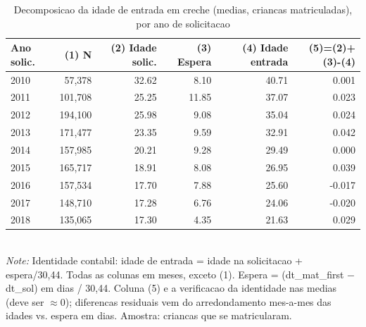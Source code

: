 \begin{table}[htbp]\centering
\caption{Decomposicao da idade de entrada em creche (medias, criancas matriculadas), por ano de solicitacao}
\label{tab:T3_decomp}
\small
\setlength{\tabcolsep}{4pt}
\begin{tabular}{lrrrrr}
\toprule
Ano solic. & (1) N & (2) Idade solic. & (3) Espera & (4) Idade entrada & (5)=(2)+(3)-(4) \\
\midrule
2010 & 57,378 & 32.62 & 8.10 & 40.71 & 0.001 \\
2011 & 101,708 & 25.25 & 11.85 & 37.07 & 0.023 \\
2012 & 194,100 & 25.98 & 9.08 & 35.04 & 0.024 \\
2013 & 171,477 & 23.35 & 9.59 & 32.91 & 0.042 \\
2014 & 157,985 & 20.21 & 9.28 & 29.49 & 0.000 \\
2015 & 165,717 & 18.91 & 8.08 & 26.95 & 0.039 \\
2016 & 157,534 & 17.70 & 7.88 & 25.60 & -0.017 \\
2017 & 148,710 & 17.28 & 6.76 & 24.06 & -0.020 \\
2018 & 135,065 & 17.30 & 4.35 & 21.63 & 0.029 \\
\bottomrule
\end{tabular}
\\[3pt]{\footnotesize \textit{Note:} Identidade contabil: idade de entrada = idade na solicitacao + espera/30,44. Todas as colunas em meses, exceto (1). Espera = (dt\_mat\_first $-$ dt\_sol) em dias / 30,44. Coluna (5) e a verificacao da identidade nas medias (deve ser $\approx 0$); diferencas residuais vem do arredondamento mes-a-mes das idades vs. espera em dias. Amostra: criancas que se matricularam.}
\end{table}
